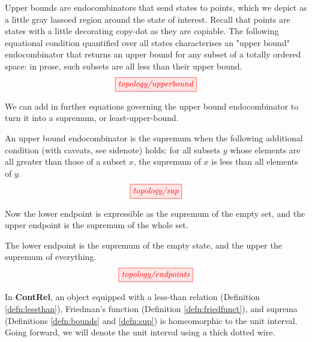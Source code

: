 \begin{defn}\label{defn:bounds}
Upper bounds are endocombinators that send states to points, which we depict as a little gray lassoed region around the state of interest. Recall that points are states with a little decorating copy-dot as they are copiable. The following equational condition quantified over all states characterises an "upper bound" endocombinator that returns an upper bound for any subset of a totally ordered space: in prose, such subsets are all less than their upper bound.
\[\tikzfig{topology/upperbound}\]
\end{defn}
We can add in further equations governing the upper bound endocombinator to turn it into a supremum, or least-upper-bound.
\begin{defn}[Suprema]\label{defn:sup}
An upper bound endocombinator is the supremum when the following additional condition (with caveats, see sidenote) holds: for all subsets $y$ whose elements are all greater than those of a subset $x$, the supremum of $x$ is less than all elements of $y$.
\[\tikzfig{topology/sup}\]
\end{defn}
Now the lower endpoint is expressible as the supremum of the empty set, and the upper endpoint is the supremum of the whole set.
\begin{defn}[Endpoints]\label{defn:endpoints}
The lower endpoint is the supremum of the empty state, and the upper the supremum of everything. 
\[\tikzfig{topology/endpoints}\]
\end{defn}

\begin{defn}
In \textbf{ContRel}, an object equipped with a less-than relation (Definition \ref{defn:lessthan}), Friedman's function (Definition \ref{defn:friedfunct}), and suprema (Definitions \ref{defn:bounds} and \ref{defn:sup}) is homeomorphic to the unit interval. Going forward, we will denote the unit interval using a thick dotted wire.
\end{defn}

